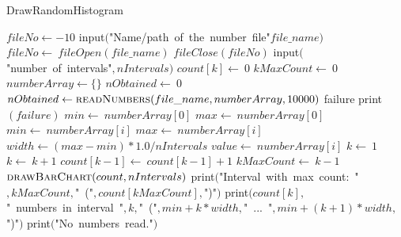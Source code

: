 \documentclass[a4paper,10pt]{article}
\begin{document}
\begin{algorithm}
\caption{DrawRandomHistogram}
\begin{algorithmic}[5]
\State {}
\State {}
  \State \(fileNo\gets-10\)
  \Repeat
    \State \(\)input\((\)"{}Name/path\ of\ the\ number\ file"{}\(file\_name)\)
    \State \(fileNo\gets\ fileOpen(file\_name)\)
    \State \(fileClose(fileNo)\)
    \State \(\)input\((\)"{}number\ of\ intervals"{}\(,nIntervals)\)
      \State \(count[k]\gets\ 0\)
    \EndFor
    \State \(kMaxCount\gets\ 0\)
    \State \(numberArray\gets\{\}\)
    \State \(nObtained\gets\ 0\)
    \Try
      \State \(nObtained\gets\Call{readNumbers}{file\_name,numberArray,10000}\)
    \EndTry
    \Catch failure
      \State \(\)print\((failure)\)
    \EndCatch %
      \State \(min\gets\ numberArray[0]\)
      \State \(max\gets\ numberArray[0]\)
          \State \(min\gets\ numberArray[i]\)
        \Else
            \State \(max\gets\ numberArray[i]\)
          \EndIf
        \EndIf
      \EndFor
      \State \(width\gets(max-min)*1.0/nIntervals\)
        \State \(value\gets\ numberArray[i]\)
        \State \(k\gets\ 1\)
          \State \(k\gets\ k+1\)
        \EndWhile
        \State \(count[k-1]\gets\ count[k-1]+1\)
          \State \(kMaxCount\gets\ k-1\)
        \EndIf
      \EndFor
      \State \(\Call{drawBarChart}{count,nIntervals}\)
      \State \(\)print\((\)"{}Interval\ with\ max\ count:\ "{}\(,kMaxCount,\)"{}\ ("{}\(,count[kMaxCount],\)"{})"{}\()\)
        \State \(\)print\((count[k],\)"{}\ numbers\ in\ interval\ "{}\(,k,\)"{}\ ("{}\(,min+k*width,\)"{}\ ...\ "{}\(,min+(k+1)*width,\)"{})"{}\()\)
      \EndFor
    \Else
      \State \(\)print\((\)"{}No\ numbers\ read."{}\()\)
    \EndIf
  \EndIf
\EndProcedure
\end{algorithmic}
\end{algorithm}
\end{document}
